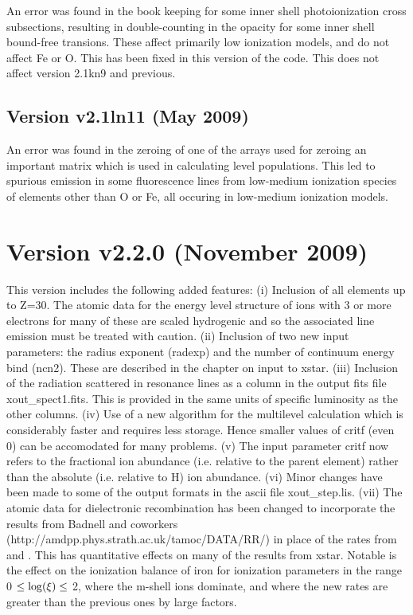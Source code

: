An error was found in the book keeping for some inner shell photoionization 
cross subsections, resulting in double-counting in the opacity 
for some inner shell bound-free transions.  These affect primarily 
low ionization models, and do not affect Fe or O.  This has been fixed 
in this version of the code.  This does not affect version 2.1kn9 and 
previous.

\subsection{Version v2.1ln11 (May 2009)}

An error was found in the zeroing of one of the arrays used for 
zeroing an important matrix which is used in calculating level populations. 
This led to spurious emission in some fluorescence lines from low-medium 
ionization species of elements other than O or Fe, all
occuring in low-medium ionization models.  

\section{Version v2.2.0 (November 2009)}

This version includes the following added features:
(i) Inclusion of all elements up to Z=30.  The atomic data for the energy level 
structure of ions with 3 or more electrons for many of these are scaled 
hydrogenic and so the associated line emission must be treated with caution.
(ii) Inclusion of two new input parameters:  the radius exponent (radexp) and the 
number of continuum energy bind (ncn2).  These are described in the chapter on 
input to xstar. (iii) Inclusion of the radiation scattered in resonance 
lines as a column in the output fits file xout\_spect1.fits.  This is provided 
in the same units of specific luminosity  as the other columns. (iv) Use 
of a new algorithm for the multilevel calculation which is considerably faster 
and requires less storage.  Hence smaller values of critf (even 0) can 
be accomodated for  many problems.  (v) The input parameter critf now 
refers to the fractional ion abundance (i.e. relative to the parent element) 
rather than the absolute (i.e. relative to H) ion abundance.
(vi) Minor changes have been made to some of the output formats in the 
ascii file xout\_step.lis. (vii) The atomic data for dielectronic recombination has 
been changed to incorporate the results from Badnell and coworkers 
(http://amdpp.phys.strath.ac.uk/tamoc/DATA/RR/) in place 
of the rates from \cite{Aldrovandi1973} and \cite{Arnaud1992}.  
This has quantitative effects on  many of the results from xstar.  Notable is 
the effect on the ionization balance of iron for ionization parameters 
in the range 0 $\leq {\rm log}(\xi) \leq$ 2, where the m-shell ions dominate, and where
the new rates are greater than the previous ones by large factors.


